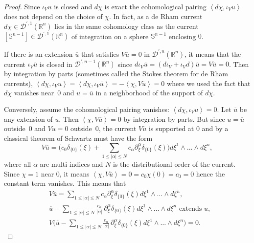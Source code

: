 \documentclass[10pt]{amsart}
\let\pazocal\mathscr
\theoremstyle{definition}
\newcommand\rr{{\mathbb R}}
\let\Feuler V
\let\exd u
\begin{document}
\begin{proof}
Since $\iota_\Feuler \exd$ is closed and $d\chi$ is exact the cohomological pairing
$\left\langle d\chi, \iota_\Feuler \exd \right\rangle
$ does not depend on the choice of $\chi$. In fact, as a de Rham current $d\chi\in \pazocal{D}^{\prime,1}(\rr^n)$ lies in the same cohomology class as the current $[\mathbb{S}^{n-1}]\in \pazocal{D}^{\prime,1}(\rr^n)$ of integration on a sphere $\mathbb{S}^{n-1}$ enclosing $0$.

If there is an extension $\overline{\exd}$ that satisfies $\Feuler \overline{\exd}=0$ in
$\pazocal{D}^{\prime,n}(\rr^n)$, it means that the current $\iota_\Feuler \overline{\exd}$ is closed in $\pazocal{D}^{\prime,n-1}(\rr^n) $
since $ d\iota_\Feuler \overline{\exd}=\left(d\iota_\Feuler+\iota_\Feuler d \right)\overline{\exd}=\Feuler \overline{\exd}=0 $.
Then by integration by parts (sometimes called the Stokes theorem for de Rham currents),
$\left\langle d\chi, \iota_\Feuler \exd \right\rangle=\left\langle d\chi, \iota_\Feuler \overline{\exd} \right\rangle=-\left\langle \chi, \Feuler \overline{\exd} \right\rangle= 0$
where we used the fact that $d\chi$ vanishes near~$0$ and $\exd=\overline{\exd}$ in a neighborhood of the support of $d\chi$.

Conversely, assume the cohomological pairing vanishes: $\left\langle d\chi, \iota_\Feuler \exd \right\rangle=0
$. Let $\overline{\exd}$ be any extension of $\exd$. Then $\left\langle \chi, \Feuler \overline{\exd} \right\rangle=0
$ by integration by parts. But since $\exd=\overline{\exd}$ outside~$0$ and $\Feuler \exd=0$ outside~$0$,
the current $\Feuler \overline{\exd}$ is supported at $0$ and by a classical theorem of Schwartz must have the form
\[
\Feuler \overline{\exd}=\biggl(c_0\delta_{\{0\}}(\xi) + \sum_{1\leqslant\vert \alpha \vert\leqslant N} c_\alpha\partial_\xi^\alpha\delta_{\{0\}}(\xi) \biggr) d\xi^1\wedge \dots\wedge d\xi^n,
\]
where all $\alpha$ are multi-indices and $N$ is the distributional
order of the current.
Since $\chi=1$ near $0$, it means
$\left\langle \chi, \Feuler \overline{\exd} \right\rangle=0
=c_0\chi(0)=c_0=0$ hence the constant term vanishes.
This means that
\begin{align*}
&\Feuler \overline{\exd}= \sum_{1\leqslant\vert \alpha \vert\leqslant N}c_\alpha\partial_\xi^\alpha\delta_{\{0\}}(\xi) d\xi^1\wedge \dots\wedge d\xi^n,\\
&\overline{\exd}- \sum_{1\leqslant\vert \alpha \vert\leqslant N}\frac{c_\alpha}{\vert\alpha\vert}\,\partial_\xi^\alpha\delta_{\{0\}}(\xi) d\xi^1\wedge \dots\wedge d\xi^n\text{ extends $\exd$},\\
\tag*{and}
&\Feuler\biggl(\overline{\exd}- \sum_{1\leqslant\vert \alpha \vert\leqslant N}\frac{c_\alpha}{\vert\alpha\vert}\,\partial_\xi^\alpha\delta_{\{0\}}(\xi) d\xi^1\wedge \dots\wedge d\xi^n \biggr)=0.
\end{align*}


\end{proof}
\end{document}
